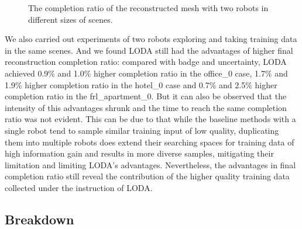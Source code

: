 \begin{figure}[h!]
    \vspace{-0.3cm}
    \caption{The completion ratio of the reconstructed mesh with two robots in different sizes of scenes. }
    \vspace{-0.1cm}
    \label{fig:two_robot}
\end{figure}

We also carried out experiments of two robots exploring and taking training data in the same scenes.
And we found LODA still had the advantages of higher final reconstruction completion ratio:
compared with badge and uncertainty, LODA achieved 0.9\% and 1.0\% higher completion ratio in the office\_0 case, 1.7\% and 1.9\% higher completion ratio in the hotel\_0 case and 0.7\% and 2.5\% higher completion ratio in the frl\_apartment\_0.
But it can also be observed that the intensity of this advantages shrunk and the time to reach the same completion ratio was not evident.
This can be due to that while the baseline methods with a single robot tend to sample similar training input of low quality, duplicating them into multiple robots does extend their searching spaces for training data of high information gain and results in more diverse samples, mitigating their limitation and limiting LODA's advantages.
Nevertheless, the advantages in final completion ratio still reveal the contribution of the higher quality training data collected under the instruction of LODA.






\subsection{Breakdown}

